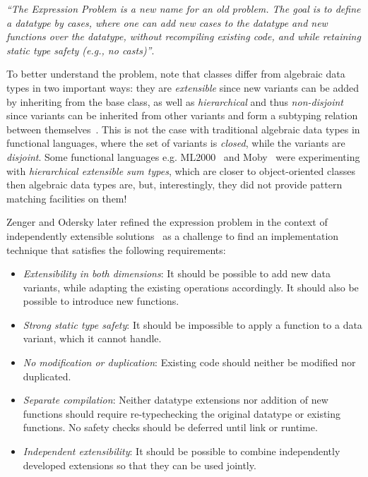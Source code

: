 \emph{``The Expression Problem is a new name for an old problem. The goal is
to define a datatype by cases, where one can add new cases to the
datatype and new functions over the datatype, without recompiling
existing code, and while retaining static type safety (e.g., no
casts)''}.

To better understand the problem, note that classes differ from algebraic data 
types in two important ways: they are \emph{extensible} since new variants can 
be added by inheriting from the base class, as well as \emph{hierarchical} and 
thus \emph{non-disjoint} since variants can be inherited from other variants and 
form a subtyping relation between themselves~\cite{Glew99}. This is not the case 
with traditional algebraic data types in functional languages, where the set of 
variants is \emph{closed}, while the variants are \emph{disjoint}. Some 
functional languages e.g. ML2000~\cite{ML2000} and Moby~\cite{Moby} were 
experimenting with \emph{hierarchical extensible sum types}, which are closer to 
object-oriented classes then algebraic data types are, but, interestingly, they 
did not provide pattern matching facilities on them!

Zenger and Odersky later refined the expression problem in the context of 
independently extensible solutions~\cite{fool12} as a challenge to find an 
implementation technique that satisfies the following requirements:

\begin{itemize}
\setlength{\itemsep}{0pt}
\setlength{\parskip}{0pt}
\item \emph{Extensibility in both dimensions}: It should be possible to add new 
      data variants, while adapting the existing operations accordingly. It 
      should also be possible to introduce new functions. 
\item \emph{Strong static type safety}: It should be impossible to apply a 
      function to a data variant, which it cannot handle. 
\item \emph{No modification or duplication}: Existing code should neither be 
      modified nor duplicated.
\item \emph{Separate compilation}: Neither datatype extensions nor addition of 
      new functions should require re-typechecking the original datatype or 
      existing functions. No safety checks should be deferred until link or 
      runtime.
\item \emph{Independent extensibility}: It should be possible to combine 
      independently developed extensions so that they can be used jointly.
\end{itemize}

